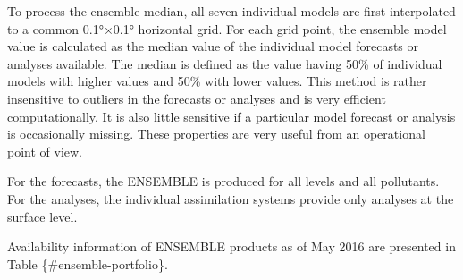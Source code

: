 \documentclass[9pt]{report}
\begin{document}
\noindent{}To process the ensemble median, all seven individual models are first interpolated to a common 0.1°×0.1° horizontal grid. 
For each grid point, the ensemble model value is calculated as the median value of the individual model forecasts or analyses available. 
The median is defined as the value having 50\% of individual models with higher values and 50\% with lower values. 
This method is rather insensitive to outliers in the forecasts or analyses and is very efficient computationally. 
It is also little sensitive if a particular model forecast or analysis is occasionally missing.
These properties are very useful from an operational point of view.%

For the forecasts, the ENSEMBLE is produced for all levels and all pollutants. 
For the analyses, the individual assimilation systems provide only analyses at the surface level.%

Availability information of ENSEMBLE products as of May 2016 are presented in Table \{\#ensemble-portfolio\}.%

\begin{table}[h!]%
\begin{mdcenter}%
{}%
\end{mdcenter}\label{ensemble-portfolio}%
\end{table}%
\end{document}
